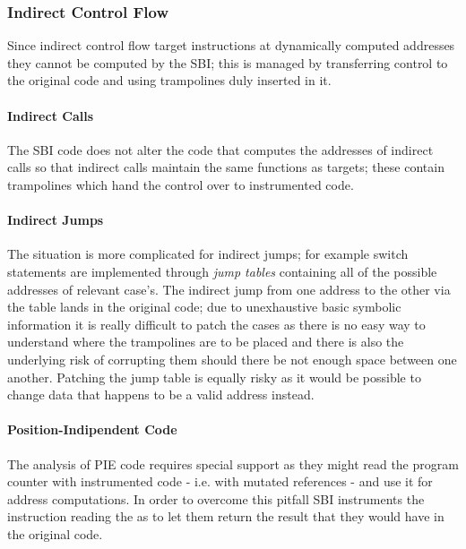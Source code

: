 \subsubsection{Indirect Control Flow}
Since indirect control flow target instructions at dynamically computed addresses they cannot be computed by the SBI;
this is managed by transferring control to the original code and using trampolines duly inserted in it. 
\paragraph{Indirect Calls} The SBI code does not alter the code that computes the addresses of indirect calls so that
indirect calls maintain the same functions as targets; these contain trampolines which hand the control over to
instrumented code.
\paragraph{Indirect Jumps} The situation is more complicated for indirect jumps; for example {\ttfamily switch}
statements are implemented through \textit{jump tables} containing all of the possible addresses of relevant {\ttfamily
case}'s. The indirect jump from one address to the other via the table lands in the original code; due to unexhaustive
basic symbolic information it is really difficult to patch the cases as there is no easy way to understand where the
trampolines are to be placed and there is also the underlying risk of corrupting them should there be not enough space
between one another. Patching the jump table is equally risky as it would be possible to change data that happens to be
a valid address instead.
\paragraph{Position-Indipendent Code} The analysis of PIE code requires special support as they might read the program
counter with instrumented code - i.e. with mutated references - and use it for address computations. In order to
overcome this pitfall SBI instruments the instruction reading the  as to let them return the result that they
would have in the original code.




